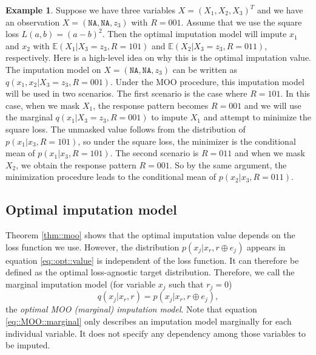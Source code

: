 \documentclass[aos, preprint]{imsart}
\theoremstyle{plain}
\theoremstyle{definition}
\newtheorem*{example}{Example}
\newcommand{\E}{\mbox{$\mathbb{E}$}}
\begin{document}
\begin{example}
Suppose we have three variables $X = (X_1,X_2,X_3)^T$
and we have an observation $X = (\texttt{NA},  \texttt{NA}, z_3)$ with $R = 001$. 
Assume that we use the square loss $L(a,b) = (a-b)^2$.
Then the optimal imputation model will impute $x_1$ and $x_2$ with
$\E(X_1|X_3 = z_3, R = 101)$ and $\E(X_2|X_3 = z_3, R=011)$, respectively. 
Here is a high-level idea on why this is the optimal imputation value. 
The imputation model on $X = (\texttt{NA},  \texttt{NA}, z_3)$ can be written as $q(x_1,x_2|X_3=z_3, R=001)$. 
Under the MOO procedure, this imputation model will be used in two scenarios. 
The first scenario is the case where $R=101$. In this case, when we mask $X_1$,
the response pattern becomes $R=001$ and we will use the marginal $q(x_1|X_3=z_3, R=001)$
to impute $X_1$ and attempt to minimize the square loss. 
The unmasked value follows from the distribution of $p(x_1|x_3,R=101)$,
so under the square loss, the minimizer is the conditional mean of $p(x_1|x_3,R=101)$. 
The second scenario is $R=011$ and when we mask $X_2$, we obtain the response pattern $R=001$.
So by the same argument, the minimization procedure leads to the conditional mean of $p(x_2|x_3,R=011)$. 
\end{example}



\subsection{Optimal imputation model}

Theorem \ref{thm::moo} shows that 
the optimal imputation value depends on the loss function we use. 
However, the
distribution $p(x_j|x_r, r\oplus e_j)$
appears in equation \eqref{eq::opt::value}
is independent of the loss function. It can therefore be defined as the optimal loss-agnostic target distribution.
Therefore, we call the marginal imputation model (for variable $x_j$ such that $r_j = 0$)
\begin{equation}
q(x_j|x_r, r) = p(x_j|x_r, r\oplus e_j), 
\label{eq::MOO::marginal}
\end{equation}
the \emph{optimal MOO (marginal) imputation model}.
Note that equation \eqref{eq::MOO::marginal} only describes
an imputation model marginally
for  each individual variable. 
It does not specify any dependency among those variables to be imputed.
\end{document}
